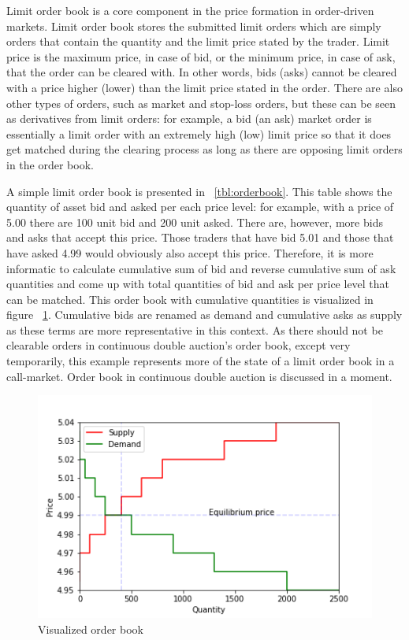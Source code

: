 Limit order book is a core component in the price formation in order-driven markets.
Limit order book stores the submitted limit orders which are simply orders that contain the quantity and 
the limit price stated by the trader. Limit price is the maximum price, in case of bid, or the minimum
price, in case of ask, that the order can be cleared with. In other words,
bids (asks) cannot be cleared with a price higher (lower) than the limit price stated 
in the order. There are also other types of orders, such as market and 
stop-loss orders, but these can be seen as derivatives from limit orders: 
for example, a bid (an ask) market order is essentially a limit order 
with an extremely high (low) limit price so that it does get matched 
during the clearing process as long as there are opposing limit orders in the 
order book. \citep{lob13} %



A simple limit order book is presented in ~\ref{tbl:orderbook}. This table shows the
quantity of asset bid and asked per each price level: for example, with a price of 5.00
there are 100 unit bid and 200 unit asked. There are, however, more bids and asks that 
accept this price. Those traders that have bid 5.01 and those that have asked 4.99 would obviously also accept
this price. Therefore, it is more informatic to calculate cumulative sum of bid and reverse cumulative sum of 
ask quantities and come up with total quantities of bid and ask per price level that can be matched.  
This order book with cumulative quantities is visualized in figure ~\ref{fig:lob_visual}. Cumulative bids
are renamed as demand and cumulative asks as supply as these terms are more representative in this context.
As there should not be clearable orders in continuous double auction's order book, except very temporarily, 
this example represents more of the state of a limit order book in a call-market. Order book
in continuous double auction is discussed in a moment.

\begin{figure}
    \begin{center}  
        \includegraphics{plots/orderbook_visualized.png}
        \caption{Visualized order book}
        \label{fig:lob_visual}
    \end{center}
\end{figure}


